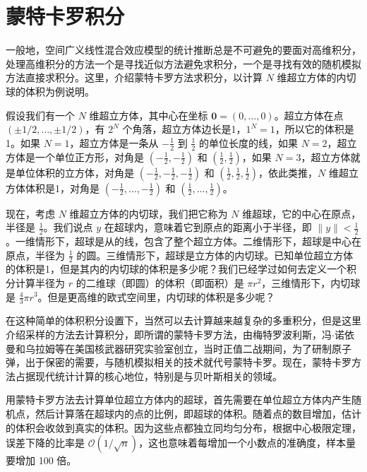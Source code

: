 \documentclass[12pt,a4paper,UTF8,twoside]{book}
\theoremstyle{definition}
\theoremstyle{definition}
\theoremstyle{definition}
\theoremstyle{remark}
\begin{document}
\hypertarget{sec:Curse-of-Dimensionality}{%
\section{蒙特卡罗积分}\label{sec:Curse-of-Dimensionality}}

一般地，空间广义线性混合效应模型的统计推断总是不可避免的要面对高维积分，处理高维积分的方法一个是寻找近似方法避免求积分，一个是寻找有效的随机模拟方法直接求积分。这里，介绍蒙特卡罗方法求积分，以计算
\(N\) 维超立方体的内切球的体积为例说明。

假设我们有一个 \(N\) 维超立方体，其中心在坐标
\(\mathbf{0} = (0,\ldots,0)\)。超立方体在点
\((\pm 1/2,\ldots,\pm 1/2)\)，有 \(2^{N}\)
个角落，超立方体边长是1，\(1^{N}=1\)，所以它的体积是1。如果
\(N=1\)，超立方体是一条从 \(-\frac{1}{2}\) 到 \(\frac{1}{2}\)
的单位长度的线，如果 \(N=2\)，超立方体是一个单位正方形，对角是
\(\left( -\frac{1}{2}, -\frac{1}{2} \right)\) 和
\(\left( \frac{1}{2}, \frac{1}{2} \right)\)，如果
\(N=3\)，超立方体就是单位体积的立方体，对角是
\(\left( -\frac{1}{2}, -\frac{1}{2}, -\frac{1}{2} \right)\) 和
\(\left( \frac{1}{2}, \frac{1}{2}, \frac{1}{2} \right)\)，依此类推，\(N\)
维超立方体体积是1，对角是
\(\left( -\frac{1}{2}, \ldots, -\frac{1}{2} \right)\) 和
\(\left( \frac{1}{2}, \ldots, \frac{1}{2} \right)\)。

现在，考虑 \(N\) 维超立方体的内切球，我们把它称为 \(N\)
维超球，它的中心在原点，半径是 \(\frac{1}{2}\)。我们说点 \(y\)
在超球内，意味着它到原点的距离小于半径，即
\(\| y \| < \frac{1}{2}\)。一维情形下，超球是从的线，包含了整个超立方体。二维情形下，超球是中心在原点，半径为
\(\frac{1}{2}\)
的圆。三维情形下，超球是立方体的内切球。已知单位超立方体的体积是1，但是其内的内切球的体积是多少呢？我们已经学过如何去定义一个积分计算半径为
\(r\) 的二维球（即圆）的体积（即面积）是
\(\pi r^2\)，三维情形下，内切球是
\(\frac{4}{3}\pi r^3\)。但是更高维的欧式空间里，内切球的体积是多少呢？

在这种简单的体积积分设置下，当然可以去计算越来越复杂的多重积分，但是这里介绍采样的方法去计算积分，即所谓的蒙特卡罗方法，由梅特罗波利斯，冯\(\cdot\)诺依曼和乌拉姆等在美国核武器研究实验室创立，当时正值二战期间，为了研制原子弹，出于保密的需要，与随机模拟相关的技术就代号蒙特卡罗。现在，蒙特卡罗方法占据现代统计计算的核心地位，特别是与贝叶斯相关的领域。

用蒙特卡罗方法去计算单位超立方体内的超球，首先需要在单位超立方体内产生随机点，然后计算落在超球内的点的比例，即超球的体积。随着点的数目增加，估计的体积会收敛到真实的体积。因为这些点都独立同均匀分布，根据中心极限定理，误差下降的比率是
\(\mathcal{O}\left( 1 / \sqrt{n} \right)\)，这也意味着每增加一个小数点的准确度，样本量要增加
100 倍。
\end{document}
